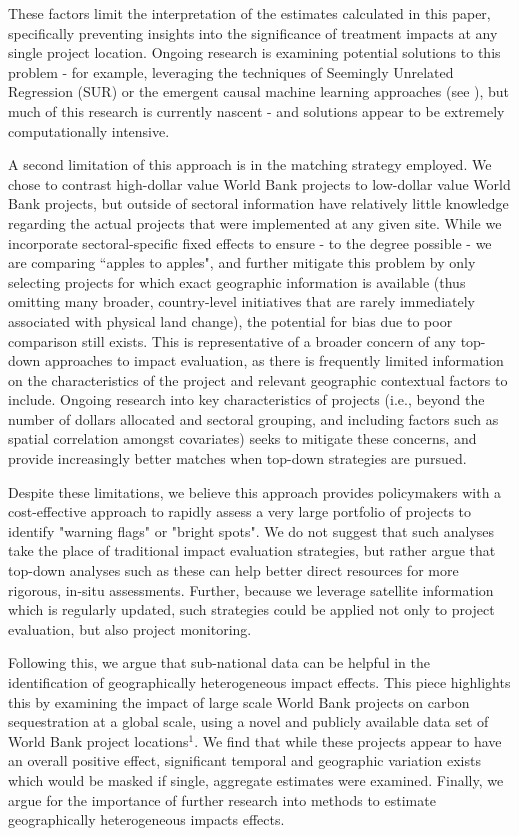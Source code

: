 \documentclass[sustainability,article,submit,moreauthors,pdftex,10pt,a4paper]{mdpi}
\begin{document}
These factors limit the interpretation of the estimates calculated in this paper, specifically preventing insights into the significance of treatment impacts at any single project location.
Ongoing research is examining potential solutions to this problem - for example, leveraging the techniques of Seemingly Unrelated Regression (SUR) or the emergent causal machine learning approaches (see \cite{athey_recursive_2015}), but much of this research is currently nascent - and solutions appear to be extremely computationally intensive.
\par
A second limitation of this approach is in the matching strategy employed. We chose to contrast high-dollar value World Bank projects to low-dollar value World Bank projects, but outside of sectoral information have relatively little knowledge regarding the actual projects that were implemented at any given site. While we incorporate sectoral-specific fixed effects to ensure - to the degree possible - we are comparing  ``apples to apples", and further mitigate this problem by only selecting projects for which exact geographic information is available (thus omitting many broader, country-level initiatives that are rarely immediately associated with physical land change), the potential for bias due to poor comparison still exists. This is representative of a broader concern of any top-down approaches to impact evaluation, as there is frequently limited information on the characteristics of the project and relevant geographic contextual factors to include. Ongoing research into key characteristics of projects (i.e., beyond the number of dollars allocated and sectoral grouping, and including factors such as spatial correlation amongst covariates) seeks to mitigate these concerns, and provide increasingly better matches when top-down strategies are pursued.
\par
Despite these limitations, we believe this approach provides policymakers with a cost-effective approach to rapidly assess a very large portfolio of projects to identify "warning flags" or "bright spots". We do not suggest that such analyses take the place of traditional impact evaluation strategies, but rather argue that top-down analyses such as these can help better direct resources for more rigorous, in-situ assessments. Further, because we leverage satellite information which is regularly updated, such strategies could be applied not only to project evaluation, but also project monitoring.
\par
Following this, we argue that sub-national data can be helpful in the identification of geographically heterogeneous impact effects. This piece highlights this by examining the impact of large scale World Bank projects on carbon sequestration at a global scale, using a novel and publicly available data set of World Bank project locations\begin{math}^{1}\end{math}. We find that while these projects appear to have an overall positive effect, significant temporal and geographic variation exists which would be masked if single, aggregate estimates were examined. Finally, we argue for the importance of further research into methods to estimate geographically heterogeneous impacts effects.
\end{document}
